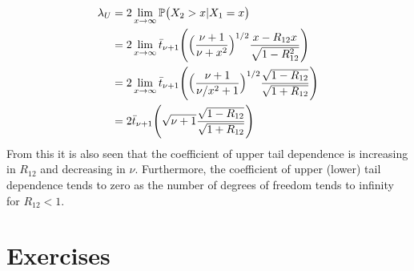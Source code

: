 \documentclass{article}
\begin{document}
\begin{equation}
	\begin{split}
		\lambda_U &= 2 \lim\limits_{x\rightarrow\infty} \mathbb{P} \bigl( X_2 > x | X_1 = x \bigr) \\
		                 &= 2 \lim\limits_{x\rightarrow\infty} \bar t_{\nu+1} \Biggl(
		                 																						  \Bigl( \frac{\nu+1}{\nu+x^2} \Bigr)^{1/2} \frac{x-R_{12}
		                 																						  x}{\sqrt{1-R_{12}^2}}
		                                                                                                \Biggr) \\
		                 &= 2 \lim\limits_{x\rightarrow\infty} \bar t_{\nu+1} \Biggl(
		                 																						  \Bigl( \frac{\nu+1}{\nu/x^2+1} \Bigr)^{1/2} \frac{\sqrt{1-
		                 																						  R_{12}}}{\sqrt{1+R_{12}}}
		                                                                                                \Biggr) \\
		                 &= 2 \bar t_{\nu+1} \Biggl(
		                 										\sqrt{\nu+1} \frac{\sqrt{1-R_{12}}}{\sqrt{1+R_{12}}}
		                                                     \Biggr) \\
	\end{split}
\end{equation}
From this it is also seen that the coefficient of upper tail dependence is increasing in $R_{12}$ and decreasing in $\nu$. Furthermore, the coefficient of upper (lower) tail dependence tends to zero as the number of degrees of freedom tends to infinity for $R_{12} < 1$.
%
%
\section{Exercises}
\end{document}
